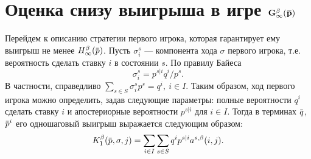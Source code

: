 {\section{Оценка снизу выигрыша в игре $\mathbf{G^\beta_\infty(\p)}$}
\label{ch3:sec:lower-bound}

Перейдем к описанию стратегии первого игрока, которая гарантирует ему выигрыш не менее $\High(\p)$.
Пусть $\sigma^s_i$ --- компонента хода $\sigma$ первого игрока, т.е. вероятность сделать ставку $i$ в состоянии $s$.
По правилу Байеса
\[
  \sigma^s_i = p^{s|i} q^i / p^s.
\]
В частности, справедливо $\sum_{s \in S} \sigma^s_i p^s = q^i,\ i \in I$.
Таким образом, ход первого игрока можно определить, задав следующие параметры: полные вероятности $q^i$ сделать ставку $i$ и апостериорные вероятности $p^{s|i}$ для $i \in I$.
Тогда в терминах $\q$, $\p^i$ его одношаговый выигрыш выражается следующим образом:
\begin{equation}
  \label{ch3:lower-bound:eq:K1(q,pi)}
  \K[1](\p, \sigma, j) = \sum_{i \in I} \sum_{s \in S} q^i p^{s|i} \as(i, j).
\end{equation}

}
